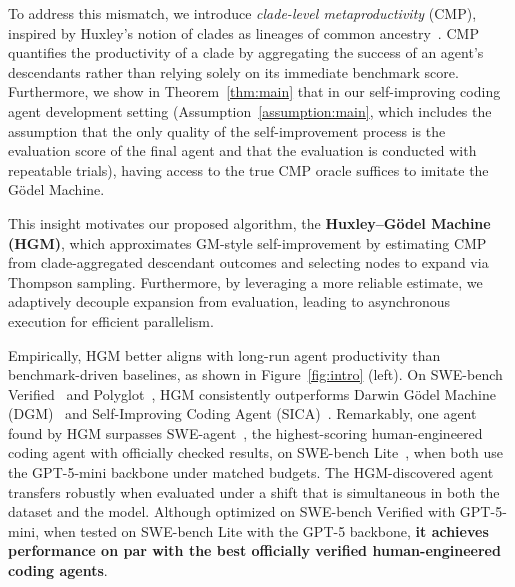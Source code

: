 \documentclass{article} %
\begin{document}
To address this mismatch, we introduce \emph{clade-level metaproductivity} ($\mathrm{CMP}$), inspired by Huxley’s notion of clades as lineages of common ancestry~\citep{huxley1957three}. $\mathrm{CMP}$ quantifies the productivity of a clade by aggregating the success of an agent’s descendants rather than relying solely on its immediate benchmark score. 
Furthermore, we show in Theorem~\ref{thm:main} that in our self-improving coding agent development setting (Assumption~\ref{assumption:main}, which includes the assumption that the only quality of the self-improvement process is the evaluation score of the final agent and that the evaluation is conducted with repeatable trials), having access to the true $\mathrm{CMP}$ oracle suffices to imitate the G\"odel Machine. 

This insight motivates our proposed algorithm, the \textbf{Huxley–G\"odel Machine (HGM)}, which approximates GM-style self-improvement by estimating $\mathrm{CMP}$ from clade-aggregated descendant outcomes and selecting nodes to expand via Thompson sampling. Furthermore, by leveraging a more reliable estimate, we adaptively decouple expansion from evaluation, leading to asynchronous execution for efficient parallelism.

Empirically, HGM better aligns with long-run agent productivity than benchmark-driven baselines, as shown in Figure~\ref{fig:intro} (left). 
On SWE-bench Verified~\citep{jimenez2024swebench,chowdhury2024swebenchverified} and Polyglot~\citep{Gauthier2024polyglot}, HGM consistently outperforms Darwin G\"odel Machine (DGM)~\citep{zhang2025dgm} and Self-Improving Coding Agent (SICA)~\citep{robeyns2025selfimprovingcodingagent}. 
Remarkably, one agent found by HGM surpasses SWE-agent~\citep{yang2024swe}, the highest-scoring human-engineered coding agent with officially checked results, on SWE-bench Lite~\citep{jimenez2024swebench}, when both use the GPT-5-mini backbone under matched budgets. 
The HGM-discovered agent transfers robustly when evaluated under a shift that is simultaneous in both the dataset and the model. Although optimized on SWE-bench Verified with GPT-5-mini, when tested on SWE-bench Lite with the GPT-5 backbone, \textbf{it achieves performance on par with the best officially verified human-engineered coding agents}.
\end{document}
